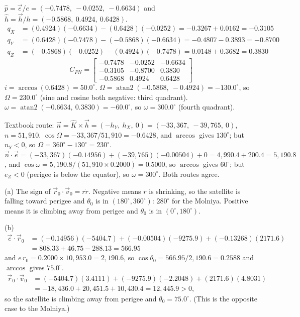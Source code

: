 \documentclass[11pt]{article}
\begin{document}
$\hat p = \vec e/e = (-0.7478,\ -0.0252,\ -0.6634)$ and $\hat h = \vec h/h = (-0.5868,\ 0.4924,\ 0.6428)$.
\begin{align*}
q_X &= (0.4924)(-0.6634) - (0.6428)(-0.0252) = -0.3267 + 0.0162 = -0.3105\\
q_Y &= (0.6428)(-0.7478) - (-0.5868)(-0.6634) = -0.4807 - 0.3893 = -0.8700\\
q_Z &= (-0.5868)(-0.0252) - (0.4924)(-0.7478) = 0.0148 + 0.3682 = 0.3830
\end{align*}
\[
C_{PN} = \begin{bmatrix}-0.7478 & -0.0252 & -0.6634\\ -0.3105 & -0.8700 & 0.3830\\ -0.5868 & 0.4924 & 0.6428\end{bmatrix}
\]
$i = \arccos(0.6428) = 50.0^\circ$.
$\Omega = \operatorname{atan2}(-0.5868,\ -0.4924) = -130.0^\circ$, so $\Omega = 230.0^\circ$ (sine and cosine
both negative: third quadrant).
$\omega = \operatorname{atan2}(-0.6634,\ 0.3830) = -60.0^\circ$, so $\omega = 300.0^\circ$ (fourth quadrant).

Textbook route: $\vec n = \hat K\times\vec h = (-h_Y,\ h_X,\ 0) = (-33{,}367,\ -39{,}765,\ 0)$, $n = 51{,}910$.
$\cos\Omega = -33{,}367/51{,}910 = -0.6428$, and $\arccos$ gives $130^\circ$; but $n_Y < 0$, so
$\Omega = 360^\circ - 130^\circ = 230^\circ$.
$\vec n\cdot\vec e = (-33{,}367)(-0.14956) + (-39{,}765)(-0.00504) + 0 = 4{,}990.4 + 200.4 = 5{,}190.8$, and
$\cos\omega = 5{,}190.8/(51{,}910 \times 0.2000) = 0.5000$, so $\arccos$ gives $60^\circ$; but $e_Z < 0$
(perigee is below the equator), so $\omega = 300^\circ$. Both routes agree. \checkmark

(a) The sign of $\vec r_0\cdot\vec v_0 = r\dot r$. Negative means $r$ is shrinking, so the satellite is falling
toward perigee and $\theta_0$ is in $(180^\circ, 360^\circ)$: $280^\circ$ for the Molniya. Positive means it is
climbing away from perigee and $\theta_0$ is in $(0^\circ, 180^\circ)$.

(b) \begin{align*}
\vec e\cdot\vec r_0 &= (-0.14956)(-5404.7) + (-0.00504)(-9275.9) + (-0.13268)(2171.6)\\
&= 808.33 + 46.75 - 288.13 = 566.95
\end{align*}
and $e\,r_0 = 0.2000\times 10{,}953.0 = 2{,}190.6$, so $\cos\theta_0 = 566.95/2{,}190.6 = 0.2588$ and
$\arccos$ gives $75.0^\circ$.
\begin{align*}
\vec r_0\cdot\vec v_0 &= (-5404.7)(3.4111) + (-9275.9)(-2.2048) + (2171.6)(4.8031)\\
&= -18{,}436.0 + 20{,}451.5 + 10{,}430.4 = 12{,}445.9 > 0 ,
\end{align*}
so the satellite is climbing away from perigee and $\theta_0 = 75.0^\circ$. (This is the opposite case to the
Molniya.)
\end{document}
